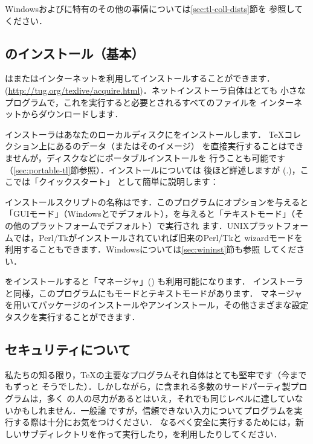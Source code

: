 \documentclass[uplatex,dvipdfmx]{jsarticle}
\begin{document}
Windowsおよび\macOS に特有のその他の事情については\ref{sec:tl-coll-dists}節を
参照してください．

\subsection{\TL のインストール（基本）}
\label{sec:basic}

\TL は\DVD またはインターネットを利用してインストールすることができます．
(\url{http://tug.org/texlive/acquire.html})．ネットインストーラ自体はとても
小さなプログラムで，これを実行すると必要とされるすべてのファイルを
インターネットからダウンロードします．

\DVD インストーラはあなたのローカルディスクに\TL をインストールします．
\TeX コレクション\DVD 上にある\TL のデータ（またはそのイメージ）
を直接実行することはできませんが，\USB ディスクなどにポータブルインストールを
行うことも可能です（\ref{sec:portable-tl}節参照）．インストールについては
後ほど詳述しますが (\p.\pageref{sec:install})，ここでは「クイックスタート」
として簡単に説明します：

\begin{itemize*}
\item インストールスクリプトの名称はです．このプログラムにオプションを与えると「GUIモード」（Windowsと\macOS でデフォルト），を与えると「テキストモード」（その他のプラットフォームでデフォルト）で実行され
ます．UNIXプラットフォームでは，Perl/Tkがインストールされていれば旧来のPerl/Tkと
wizardモードを利用することもできます．Windowsについては\ref{sec:wininst}節も参照
してください．

\item \TL をインストールすると「\TL マネージャ」() も利用可能になります．
インストーラと同様，このプログラムにも\GUI モードとテキストモードがあります．\TL
マネージャを用いてパッケージのインストールやアンインストール，その他さまざまな設定
タスクを実行することができます．
\end{itemize*}

\subsection{セキュリティについて}
\label{sec:security}

私たちの知る限り，\TeX の主要なプログラムそれ自体はとても堅牢です（今までもずっと
そうでした）．しかしながら，\TL に含まれる多数のサードパーティ製プログラムは，多く
の人の尽力があるとはいえ，それでも同じレベルに達していないかもしれません．一般論
ですが，信頼できない入力についてプログラムを実行する際は十分にお気をつけください．
なるべく安全に実行するためには，新しいサブディレクトリを作って実行したり，を利用したりしてください．
\end{document}
